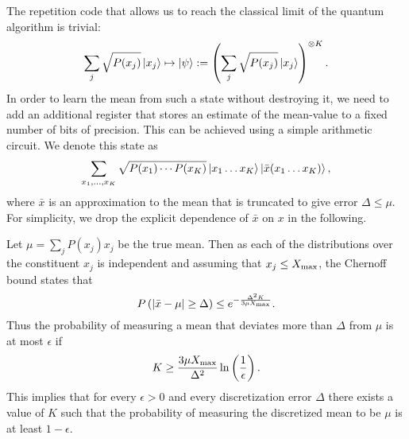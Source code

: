 \documentclass[aps,amsmath,onecolumn,amssymb,notitlepage]{revtex4-1}
\begin{document}
The repetition code that allows us to reach the classical limit of the quantum algorithm is trivial:
\begin{equation}
\sum_{j} \sqrt{P(x_j)} \left|x_j\right\rangle \mapsto \left|\psi\right\rangle:= \left(\sum_j \sqrt{P(x_j)} \left|x_j\right\rangle\right)^{\otimes K}.
\end{equation}
In order to learn the mean from such a state without destroying it, we need to add an additional register that stores an estimate of the mean-value to a fixed number of bits of precision.  This can be achieved using a simple arithmetic circuit.  We denote this state as
\begin{equation}
\sum_{x_1,\ldots,x_K} \sqrt{P(x_1)\cdots P(x_K)} \left|x_1\ldots x_K\right\rangle \left|\bar{x}(x_1\ldots x_K)\right\rangle,
\end{equation}
where $\bar{x}$ is an approximation to the mean that is truncated to give error $\Delta\le \mu$.  For simplicity, we drop the explicit dependence of $\bar{x}$ on $x$ in the following.

Let $\mu= \sum_j P(x_j) x_j$ be the true mean.  Then as each of the distributions over the constituent $x_j$ is independent and assuming that $x_j \le X_{\rm max}$, the Chernoff bound states that
\begin{equation}
P\left(\left|\bar{x} - \mu\right|\ge \Delta \right)\le e^{-\frac{\Delta^2 K}{3\mu X_{\rm max}}}.
\end{equation}
Thus the probability of measuring a mean that deviates more than $\Delta$ from $\mu$ is at most $\epsilon$ if
\begin{equation}
K\ge \frac{3\mu X_{\rm max}}{\Delta^2}\ln\left(\frac{1}{\epsilon} \right).
\end{equation}
This implies that for every $\epsilon>0$ and every discretization error $\Delta$ there exists a value of $K$ such that the probability of measuring the discretized mean to be $\mu$ is at least $1-\epsilon$.
\end{document}
